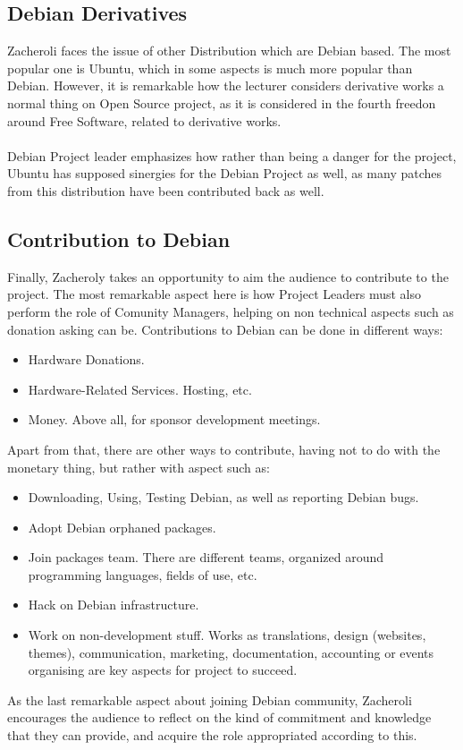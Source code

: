 \documentclass[11pt]{article}
\begin{document}
\subsection{Debian Derivatives}
Zacheroli faces the issue of other Distribution which are Debian based. The most popular one is Ubuntu, which in some aspects is much more popular than Debian. However, it is remarkable how the lecturer considers derivative works a normal thing on Open Source project, as it is considered in the fourth freedon around Free Software, related to derivative works.\\
\\
Debian Project leader emphasizes how rather than being a danger for the project, Ubuntu has supposed sinergies for the Debian Project as well, as many patches from this distribution have been contributed back as well.

\subsection{Contribution to Debian}
Finally, Zacheroly takes an opportunity to aim the audience to contribute to the project. The most remarkable aspect here is how Project Leaders must also perform the role of Comunity Managers, helping on non technical aspects such as donation asking can be. Contributions to Debian can be done in different ways:
\begin{itemize}\itemsep0pt
\item{Hardware Donations}. 
\item{Hardware-Related Services}. Hosting, etc.
\item{Money}. Above all, for sponsor development meetings.
\end{itemize}
Apart from that, there are other ways to contribute, having not to do with the monetary thing, but rather with aspect such as:
\begin{itemize}\itemsep0pt
\item{Downloading, Using, Testing Debian, as well as reporting Debian bugs}. 
\item{Adopt Debian orphaned packages}.
\item{Join packages team}. There are different teams, organized around programming languages, fields of use, etc. 
\item{Hack on Debian infrastructure}.
\item{Work on non-development stuff}.  Works as translations, design (websites, themes), communication, marketing, documentation, accounting or events organising are key aspects for project to succeed.
\end{itemize}
As the last remarkable aspect about joining Debian community, Zacheroli encourages the audience to reflect on the kind of commitment and knowledge that they can provide, and acquire the role appropriated according to this.
\end{document}
